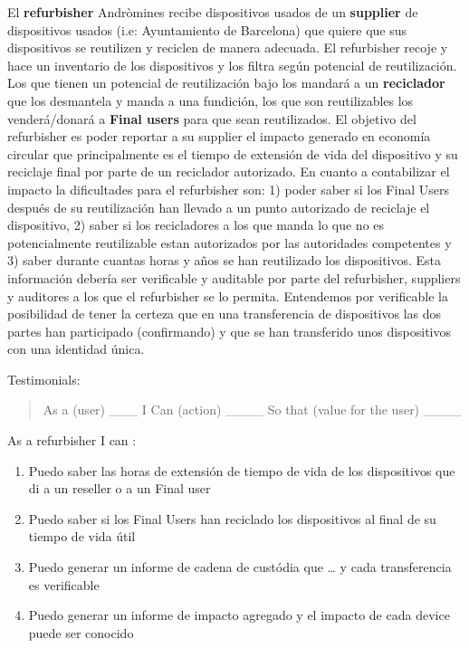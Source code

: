\documentclass[
]{book}
\begin{document}
El \textbf{refurbisher} Andròmines recibe dispositivos usados de un \textbf{supplier} de dispositivos usados (i.e: Ayuntamiento de Barcelona) que quiere que sus dispositivos se reutilizen y reciclen de manera adecuada. El refurbisher recoje y hace un inventario de los dispositivos y los filtra según potencial de reutilización. Los que tienen un potencial de reutilización bajo los mandará a un \textbf{reciclador} que los desmantela y manda a una fundición, los que son reutilizables los venderá/donará a \textbf{Final users} para que sean reutilizados. El objetivo del refurbisher es poder reportar a su supplier el impacto generado en economía circular que principalmente es el tiempo de extensión de vida del dispositivo y su reciclaje final por parte de un reciclador autorizado. En cuanto a contabilizar el impacto la dificultades para el refurbisher son: 1) poder saber si los Final Users después de su reutilización han llevado a un punto autorizado de reciclaje el dispositivo, 2) saber si los recicladores a los que manda lo que no es potencialmente reutilizable estan autorizados por las autoridades competentes y 3) saber durante cuantas horas y años se han reutilizado los dispositivos. Esta información debería ser verificable y auditable por parte del refurbisher, suppliers y auditores a los que el refurbisher se lo permita. Entendemos por verificable la posibilidad de tener la certeza que en una transferencia de dispositivos las dos partes han participado (confirmando) y que se han transferido unos dispositivos con una identidad única.

Testimonials:

\begin{quote}
As a (user) \_\_\_ I Can (action) \_\_\_\_ So that (value for the user) \_\_\_\_
\end{quote}

As a refurbisher I can :

\begin{enumerate}
\def\labelenumi{\arabic{enumi}.}
\item
  Puedo saber las horas de extensión de tiempo de vida de los dispositivos que di a un reseller o a un Final user
\item
  Puedo saber si los Final Users han reciclado los dispositivos al final de su tiempo de vida útil
\item
  Puedo generar un informe de cadena de custódia que \ldots{} y cada transferencia es verificable
\item
  Puedo generar un informe de impacto agregado y el impacto de cada device puede ser conocido
\end{enumerate}
\end{document}
